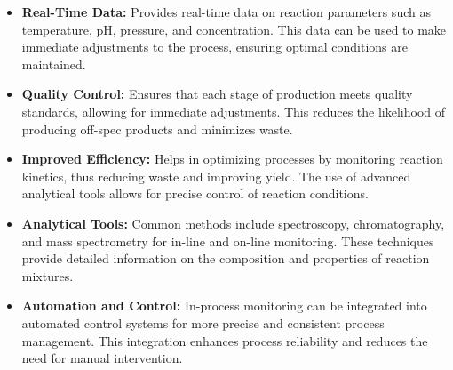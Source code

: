 \documentclass[11pt]{article}
\begin{document}
\begin{itemize}
    \item \textbf{Real-Time Data:} Provides real-time data on reaction parameters such as temperature, pH, pressure, and concentration. This data can be used to make immediate adjustments to the process, ensuring optimal conditions are maintained.
    \item \textbf{Quality Control:} Ensures that each stage of production meets quality standards, allowing for immediate adjustments. This reduces the likelihood of producing off-spec products and minimizes waste.
    \item \textbf{Improved Efficiency:} Helps in optimizing processes by monitoring reaction kinetics, thus reducing waste and improving yield. The use of advanced analytical tools allows for precise control of reaction conditions.
    \item \textbf{Analytical Tools:} Common methods include spectroscopy, chromatography, and mass spectrometry for in-line and on-line monitoring. These techniques provide detailed information on the composition and properties of reaction mixtures.
    \item \textbf{Automation and Control:} In-process monitoring can be integrated into automated control systems for more precise and consistent process management. This integration enhances process reliability and reduces the need for manual intervention.
\end{itemize}
\end{document}
